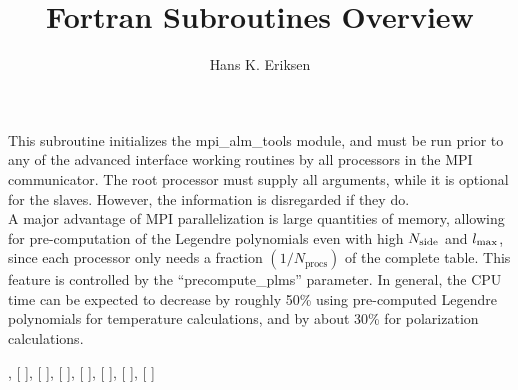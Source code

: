 
\sloppy


\title{\healpix Fortran Subroutines Overview}
 \section[mpi\_initialize\_alm\_tools]{ }
\label{sub:mpi_initialize_alm_tools}
\author{Hans K. Eriksen}

\begin{facility}
{This subroutine initializes the mpi\_alm\_tools module, and must be
run prior to any of the advanced interface working routines by all
processors in the MPI communicator. The root processor must supply all arguments, 
while it is optional for the slaves. However, the information is disregarded 
if they do.\\
A major advantage of MPI parallelization is large quantities
of memory, allowing for pre-computation of the Legendre 
polynomials even with high $N_\mathrm{side}$ and
$l_{\mathrm{max}}$, since each processor only needs a fraction
$(1/N_{\mathrm{procs}})$ of the complete table. This feature is
controlled by the ``precompute\_plms'' parameter. In general, the CPU
time can be expected to decrease by roughly 50\% using pre-computed
Legendre polynomials for temperature calculations, and by about 30\%
for polarization calculations.
}
{\modMpiAlmTools}
\end{facility}

\begin{f90format}
{%
, [%
], [%
], [%
], [%
], [%
], [%
], [%
]}
\end{f90format}

